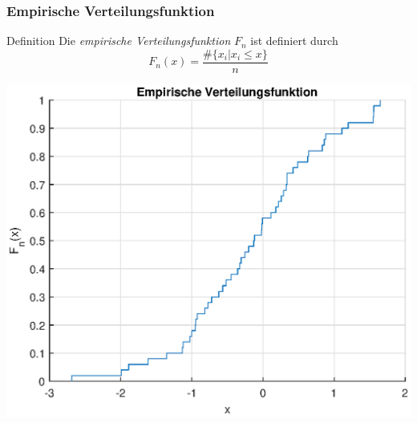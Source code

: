 \begin{frame}
\frametitle{Empirische Verteilungsfunktion}

\begin{block}{Definition}
Die \textit{empirische Verteilungsfunktion} $F_n$ ist definiert durch\[
F_n(x) = \frac{\#\{x_i| x_i \leq x\}}{n}
\]
\end{block}
\pause
\begin{center}
\includegraphics[scale=0.4]{images/empirische_verteilungsfunktion_bsp.eps} 
\end{center}
\end{frame}

